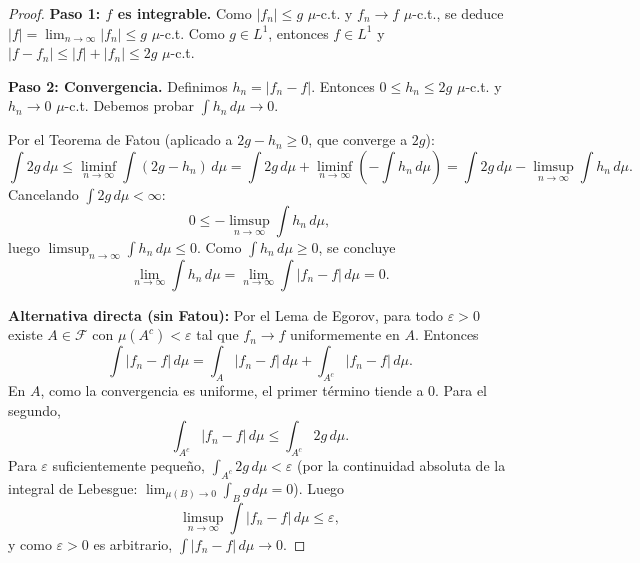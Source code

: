 \documentclass[11pt,a4paper]{article}
\theoremstyle{plain}
\theoremstyle{definition}
\begin{document}
\begin{proof}
\textbf{Paso 1: $f$ es integrable.} Como $|f_{n}|\le g$ $\mu$-c.t. y $f_{n}\to f$ $\mu$-c.t., se deduce $|f|=\lim_{n\to\infty}|f_{n}|\le g$ $\mu$-c.t. Como $g\in L^{1}$, entonces $f\in L^{1}$ y $|f-f_{n}|\le|f|+|f_{n}|\le 2g$ $\mu$-c.t.

\textbf{Paso 2: Convergencia.} Definimos $h_{n}=|f_{n}-f|$. Entonces $0\le h_{n}\le 2g$ $\mu$-c.t. y $h_{n}\to 0$ $\mu$-c.t. Debemos probar $\int h_{n}\,d\mu\to 0$.

Por el Teorema de Fatou (aplicado a $2g-h_{n}\ge 0$, que converge a $2g$):
\[
\int 2g\,d\mu\le\liminf_{n\to\infty}\int(2g-h_{n})\,d\mu=\int 2g\,d\mu+\liminf_{n\to\infty}\left(-\int h_{n}\,d\mu\right)=\int 2g\,d\mu-\limsup_{n\to\infty}\int h_{n}\,d\mu.
\]
Cancelando $\int 2g\,d\mu<\infty$:
\[
0\le -\limsup_{n\to\infty}\int h_{n}\,d\mu,
\]
luego $\limsup_{n\to\infty}\int h_{n}\,d\mu\le 0$. Como $\int h_{n}\,d\mu\ge 0$, se concluye
\[
\lim_{n\to\infty}\int h_{n}\,d\mu=\lim_{n\to\infty}\int|f_{n}-f|\,d\mu=0.
\]

\textbf{Alternativa directa (sin Fatou):} Por el Lema de Egorov, para todo $\varepsilon>0$ existe $A\in\mathcal{F}$ con $\mu(A^{c})<\varepsilon$ tal que $f_{n}\to f$ uniformemente en $A$. Entonces
\[
\int|f_{n}-f|\,d\mu=\int_{A}|f_{n}-f|\,d\mu+\int_{A^{c}}|f_{n}-f|\,d\mu.
\]
En $A$, como la convergencia es uniforme, el primer término tiende a $0$. Para el segundo,
\[
\int_{A^{c}}|f_{n}-f|\,d\mu\le\int_{A^{c}}2g\,d\mu.
\]
Para $\varepsilon$ suficientemente pequeño, $\int_{A^{c}}2g\,d\mu<\varepsilon$ (por la continuidad absoluta de la integral de Lebesgue: $\lim_{\mu(B)\to 0}\int_{B}g\,d\mu=0$). Luego
\[
\limsup_{n\to\infty}\int|f_{n}-f|\,d\mu\le\varepsilon,
\]
y como $\varepsilon>0$ es arbitrario, $\int|f_{n}-f|\,d\mu\to 0$.
\end{proof}
\end{document}
